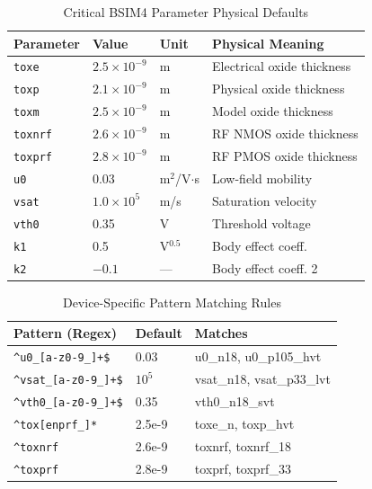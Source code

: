 \documentclass[conference]{IEEEtran}
\begin{document}
\begin{table}[!t]
\caption{Critical BSIM4 Parameter Physical Defaults}
\label{tab:critical_params}
\centering
\renewcommand{\arraystretch}{1.2}
\begin{tabular}{@{}llll@{}}
\toprule
\textbf{Parameter} & \textbf{Value} & \textbf{Unit} & \textbf{Physical Meaning} \\
\midrule
\texttt{toxe} & $2.5\times10^{-9}$ & m & Electrical oxide thickness \\
\texttt{toxp} & $2.1\times10^{-9}$ & m & Physical oxide thickness \\
\texttt{toxm} & $2.5\times10^{-9}$ & m & Model oxide thickness \\
\texttt{toxnrf} & $2.6\times10^{-9}$ & m & RF NMOS oxide thickness \\
\texttt{toxprf} & $2.8\times10^{-9}$ & m & RF PMOS oxide thickness \\
\midrule
\texttt{u0} & 0.03 & m$^2$/V$\cdot$s & Low-field mobility \\
\texttt{vsat} & $1.0\times10^{5}$ & m/s & Saturation velocity \\
\texttt{vth0} & 0.35 & V & Threshold voltage \\
\texttt{k1} & 0.5 & V$^{0.5}$ & Body effect coeff. \\
\texttt{k2} & $-0.1$ & --- & Body effect coeff. 2 \\
\bottomrule
\end{tabular}
\end{table}

\begin{table}[!t]
\caption{Device-Specific Pattern Matching Rules}
\label{tab:device_patterns}
\centering
\renewcommand{\arraystretch}{1.2}
\begin{tabular}{@{}lll@{}}
\toprule
\textbf{Pattern (Regex)} & \textbf{Default} & \textbf{Matches} \\
\midrule
\texttt{\^{}u0\_[a-z0-9\_]+\$} & 0.03 & u0\_n18, u0\_p105\_hvt \\
\texttt{\^{}vsat\_[a-z0-9\_]+\$} & $10^5$ & vsat\_n18, vsat\_p33\_lvt \\
\texttt{\^{}vth0\_[a-z0-9\_]+\$} & 0.35 & vth0\_n18\_svt \\
\texttt{\^{}tox[enprf\_]*} & 2.5e-9 & toxe\_n, toxp\_hvt \\
\texttt{\^{}toxnrf} & 2.6e-9 & toxnrf, toxnrf\_18 \\
\texttt{\^{}toxprf} & 2.8e-9 & toxprf, toxprf\_33 \\
\bottomrule
\end{tabular}
\end{table}
\end{document}
